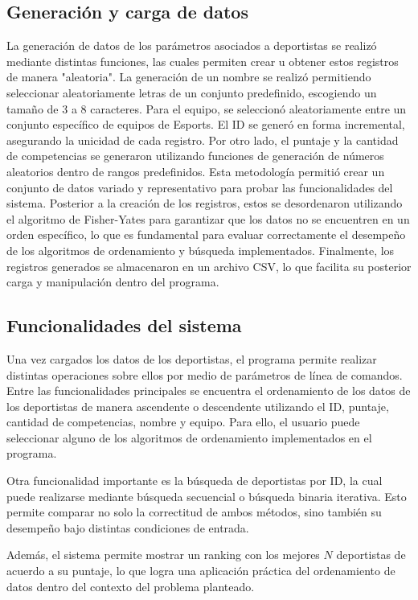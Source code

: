 \subsection{Generación y carga de datos}
La generación de datos de los parámetros asociados a deportistas se realizó mediante distintas funciones, las cuales permiten crear u obtener estos registros de manera "aleatoria". La generación de un nombre se realizó permitiendo seleccionar aleatoriamente letras de un conjunto predefinido, escogiendo un tamaño de 3 a 8 caracteres. Para el equipo, se seleccionó aleatoriamente entre un conjunto específico de equipos de Esports. El ID se generó en forma incremental, asegurando la unicidad de cada registro. Por otro lado, el puntaje y la cantidad de competencias se generaron utilizando funciones de generación de números aleatorios dentro de rangos predefinidos. Esta metodología permitió crear un conjunto de datos variado y representativo para probar las funcionalidades del sistema. Posterior a la creación de los registros, estos se desordenaron utilizando el algoritmo de Fisher-Yates para garantizar que los datos no se encuentren en un orden específico, lo que es fundamental para evaluar correctamente el desempeño de los algoritmos de ordenamiento y búsqueda implementados. Finalmente, los registros generados se almacenaron en un archivo CSV, lo que facilita su posterior carga y manipulación dentro del programa.


\subsection{Funcionalidades del sistema}
Una vez cargados los datos de los deportistas, el programa permite realizar distintas operaciones sobre ellos por medio de parámetros de línea de comandos. Entre las funcionalidades principales se encuentra el ordenamiento de los datos de los deportistas de manera ascendente o descendente utilizando el ID, puntaje, cantidad de competencias, nombre y equipo. Para ello, el usuario puede seleccionar alguno de los algoritmos de ordenamiento implementados en el programa.

Otra funcionalidad importante es la búsqueda de deportistas por ID, la cual puede realizarse mediante búsqueda secuencial o búsqueda binaria iterativa. Esto permite comparar no solo la correctitud de ambos métodos, sino también su desempeño bajo distintas condiciones de entrada.

Además, el sistema permite mostrar un ranking con los mejores \(N\) deportistas de acuerdo a su puntaje, lo que logra una aplicación práctica del ordenamiento de datos dentro del contexto del problema planteado.

